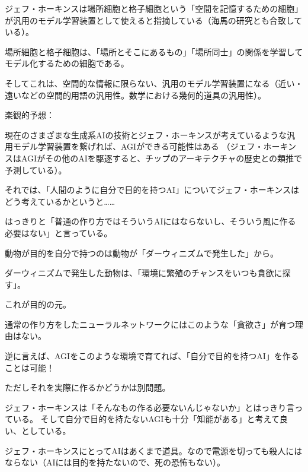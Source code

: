 \documentclass[12pt, unicode]{beamer}
\begin{document}
\begin{frame}

ジェフ・ホーキンスは場所細胞と格子細胞という「空間を記憶するための細胞」が汎用のモデル学習装置として使えると指摘している（海馬の研究とも合致している）。

場所細胞と格子細胞は、「場所とそこにあるもの」「場所同士」の関係を学習してモデル化するための細胞である。

そしてこれは、空間的な情報に限らない、汎用のモデル学習装置になる（近い・遠いなどの空間的用語の汎用性。数学における幾何的道具の汎用性）。

\end{frame}

\begin{frame}
楽観的予想：

現在のさまざまな生成系AIの技術とジェフ・ホーキンスが考えているような汎用モデル学習装置を繋げれば、AGIができる可能性はある
（ジェフ・ホーキンスはAGIがその他のAIを駆逐すると、チップのアーキテクチャの歴史との類推で予測している）。

\end{frame}

\begin{frame}

それでは、「人間のように自分で目的を持つAI」についてジェフ・ホーキンスはどう考えているかというと……

\end{frame}

\begin{frame}

はっきりと「普通の作り方ではそういうAIにはならないし、そういう風に作る必要はない」と言っている。

\end{frame}

\begin{frame}

動物が目的を自分で持つのは動物が「ダーウィニズムで発生した」から。

ダーウィニズムで発生した動物は、「環境に繁殖のチャンスをいつも貪欲に探す」。

これが目的の元。

通常の作り方をしたニューラルネットワークにはこのような「貪欲さ」が育つ理由はない。

逆に言えば、AGIをこのような環境で育てれば、「自分で目的を持つAI」を作ることは可能！

\end{frame}

\begin{frame}

ただしそれを実際に作るかどうかは別問題。

ジェフ・ホーキンスは「そんなもの作る必要ないんじゃないか」とはっきり言っている。
そして自分で目的を持たないAGIも十分「知能がある」と考えて良い、としている。

ジェフ・ホーキンスにとってAIはあくまで道具。なので電源を切っても殺人にはならない（AIには目的を持たないので、死の恐怖もない）。

\end{frame}
\end{document}
